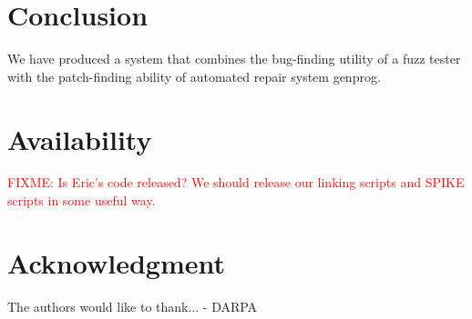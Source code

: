 \documentclass[conference]{IEEEtran}
\newcommand{\FIXME}[1]{\textcolor{red}{FIXME: #1}}
\begin{document}
\section{Conclusion}
We have produced a system that combines the bug-finding utility of a fuzz tester
with the patch-finding ability of automated repair system genprog.


\section{Availability}
\FIXME{Is Eric's code released?  We should release our linking scripts and
SPIKE scripts in some useful way.}

\section*{Acknowledgment}

The authors would like to thank...
- DARPA



\end{document}
